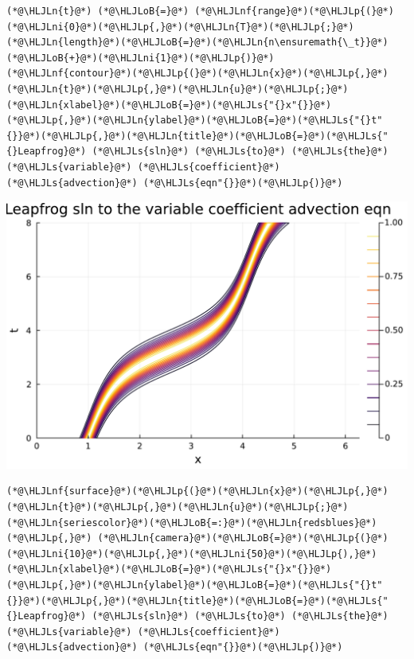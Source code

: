 \documentclass[12pt,landscape]{article}
\newcommand{\HLJLn}[1]{#1}
\newcommand{\HLJLnf}[1]{\textcolor[RGB]{66,102,213}{#1}}
\newcommand{\HLJLs}[1]{\textcolor[RGB]{201,61,57}{#1}}
\newcommand{\HLJLni}[1]{\textcolor[RGB]{59,151,46}{#1}}
\newcommand{\HLJLoB}[1]{\textcolor[RGB]{102,102,102}{\textbf{#1}}}
\newcommand{\HLJLp}[1]{#1}
\begin{document}
{\begin{lstlisting}
(*@\HLJLn{t}@*) (*@\HLJLoB{=}@*) (*@\HLJLnf{range}@*)(*@\HLJLp{(}@*)(*@\HLJLni{0}@*)(*@\HLJLp{,}@*)(*@\HLJLn{T}@*)(*@\HLJLp{;}@*)(*@\HLJLn{length}@*)(*@\HLJLoB{=}@*)(*@\HLJLn{n\ensuremath{\_t}}@*)(*@\HLJLoB{+}@*)(*@\HLJLni{1}@*)(*@\HLJLp{)}@*)
(*@\HLJLnf{contour}@*)(*@\HLJLp{(}@*)(*@\HLJLn{x}@*)(*@\HLJLp{,}@*)(*@\HLJLn{t}@*)(*@\HLJLp{,}@*)(*@\HLJLn{u}@*)(*@\HLJLp{;}@*)(*@\HLJLn{xlabel}@*)(*@\HLJLoB{=}@*)(*@\HLJLs{"{}x"{}}@*)(*@\HLJLp{,}@*)(*@\HLJLn{ylabel}@*)(*@\HLJLoB{=}@*)(*@\HLJLs{"{}t"{}}@*)(*@\HLJLp{,}@*)(*@\HLJLn{title}@*)(*@\HLJLoB{=}@*)(*@\HLJLs{"{}Leapfrog}@*) (*@\HLJLs{sln}@*) (*@\HLJLs{to}@*) (*@\HLJLs{the}@*) (*@\HLJLs{variable}@*) (*@\HLJLs{coefficient}@*) (*@\HLJLs{advection}@*) (*@\HLJLs{eqn"{}}@*)(*@\HLJLp{)}@*)
\end{lstlisting}

\includegraphics[width=\linewidth]{jl_qsW2Qg/Fourier_20_1.pdf}

\begin{lstlisting}
(*@\HLJLnf{surface}@*)(*@\HLJLp{(}@*)(*@\HLJLn{x}@*)(*@\HLJLp{,}@*)(*@\HLJLn{t}@*)(*@\HLJLp{,}@*)(*@\HLJLn{u}@*)(*@\HLJLp{;}@*)(*@\HLJLn{seriescolor}@*)(*@\HLJLoB{=:}@*)(*@\HLJLn{redsblues}@*)(*@\HLJLp{,}@*) (*@\HLJLn{camera}@*)(*@\HLJLoB{=}@*)(*@\HLJLp{(}@*)(*@\HLJLni{10}@*)(*@\HLJLp{,}@*)(*@\HLJLni{50}@*)(*@\HLJLp{),}@*)
(*@\HLJLn{xlabel}@*)(*@\HLJLoB{=}@*)(*@\HLJLs{"{}x"{}}@*)(*@\HLJLp{,}@*)(*@\HLJLn{ylabel}@*)(*@\HLJLoB{=}@*)(*@\HLJLs{"{}t"{}}@*)(*@\HLJLp{,}@*)(*@\HLJLn{title}@*)(*@\HLJLoB{=}@*)(*@\HLJLs{"{}Leapfrog}@*) (*@\HLJLs{sln}@*) (*@\HLJLs{to}@*) (*@\HLJLs{the}@*) (*@\HLJLs{variable}@*) (*@\HLJLs{coefficient}@*) (*@\HLJLs{advection}@*) (*@\HLJLs{eqn"{}}@*)(*@\HLJLp{)}@*)
\end{lstlisting}

}
\end{document}
